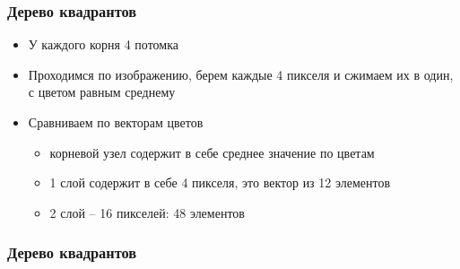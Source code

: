 \documentclass[xetex,mathserif,serif]{beamer}
\begin{document}
\begin{frame}
	\frametitle{Дерево квадрантов}

	\begin{itemize}
		\item У каждого корня 4 потомка
		\item Проходимся по изображению, берем каждые 4 пикселя и сжимаем их в один, с цветом равным среднему
		\item Сравниваем по векторам цветов
		      \begin{itemize}
			      \item корневой узел содержит в себе среднее значение по цветам
			      \item 1 слой содержит в себе 4 пикселя, это вектор из 12 элементов
			      \item 2 слой -- 16 пикселей: 48 элементов
		      \end{itemize}
	\end{itemize}
\end{frame}


\begin{frame}
	\frametitle{Дерево квадрантов}

	\begin{figure}[]
		\centering
		\hfill
	\end{figure}
\end{frame}
\end{document}
